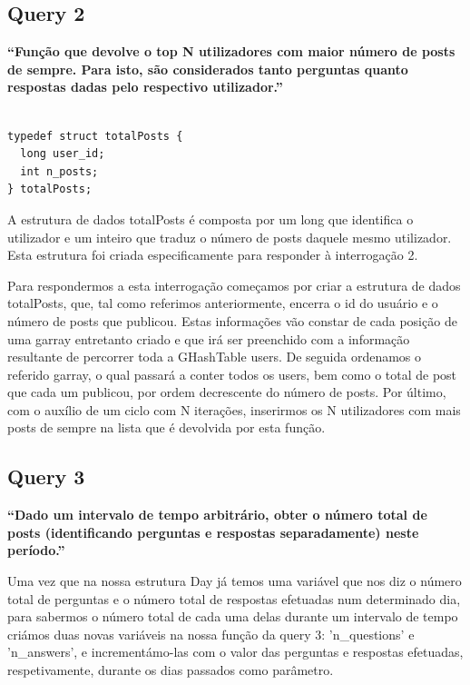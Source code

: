 \documentclass[a4paper]{report}
\begin{document}
\subsection*{Query 2}
\label{sec:query2}

\textbf{“Função que devolve o top N utilizadores com maior número
de posts de sempre. Para isto, são considerados tanto perguntas
quanto respostas dadas pelo respectivo utilizador.”}

\begin{verbatim}

typedef struct totalPosts {
  long user_id;
  int n_posts;
} totalPosts;

\end{verbatim}

A estrutura de dados totalPosts é composta por um long que identifica o utilizador
e um inteiro que traduz o número de posts daquele mesmo utilizador.
Esta estrutura foi criada especificamente para responder à interrogação 2.

Para respondermos a esta interrogação começamos por criar a estrutura de dados
totalPosts, que, tal como referimos anteriormente, encerra o id do usuário e o número
de posts que publicou. Estas informações vão constar de cada posição de uma garray
entretanto criado e que irá ser preenchido com a informação resultante de percorrer
toda a GHashTable users. De seguida ordenamos o referido garray, o qual passará a
conter todos os users, bem como o total de post que cada um publicou, por ordem
decrescente do número de posts. Por último, com o auxílio de um ciclo com N iterações,
inserirmos os N utilizadores com mais posts de sempre na lista que é devolvida por
esta função.

\subsection*{Query 3}
\label{sec:query3}

\textbf{“Dado um intervalo de tempo arbitrário,
obter o número total de posts (identificando perguntas e respostas separadamente) neste período.”}

Uma vez que na nossa estrutura Day já temos uma variável que nos diz o número total de perguntas
e o número total de respostas efetuadas num determinado dia, para sabermos o
número total de cada uma delas durante um intervalo de tempo criámos duas novas
variáveis na nossa função da query 3: \textsf{'n\_questions'} e \textsf{'n\_answers'},
e incrementámo-las com o valor das perguntas e respostas efetuadas, respetivamente,
durante os dias passados como parâmetro.
\end{document}
